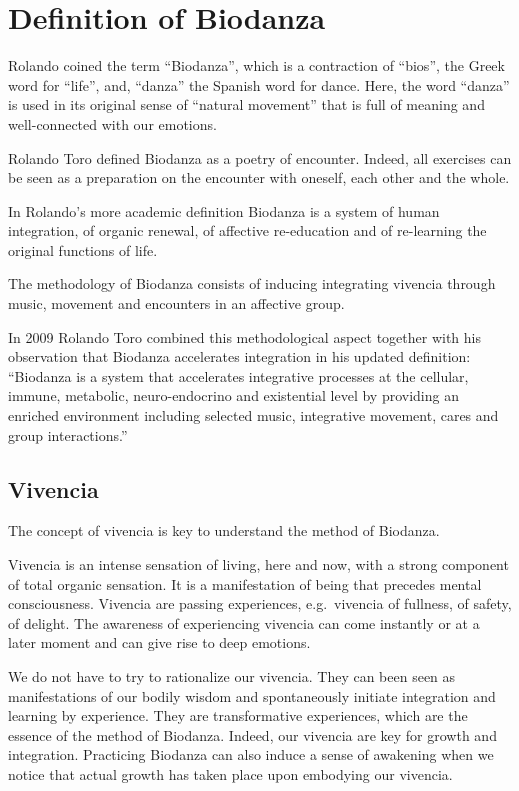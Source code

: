 \documentclass[
  11pt,
]{book}
\begin{document}
\hypertarget{definition-of-biodanza}{%
\section{Definition of Biodanza}\label{definition-of-biodanza}}

Rolando coined the term ``Biodanza'', which is a contraction of ``bios'', the Greek word for ``life'', and, ``danza'' the Spanish word for dance. Here, the word ``danza'' is used in its original sense of ``natural movement'' that is full of meaning and well-connected with our emotions.

Rolando Toro defined Biodanza as a poetry of encounter. Indeed, all exercises can be seen as a preparation on the encounter with oneself, each other and the whole.

In Rolando's more academic definition Biodanza is a system of human integration, of organic renewal, of affective re-education and of re-learning the original functions of life.

The methodology of Biodanza consists of inducing integrating vivencia through music, movement and encounters in an affective group.

In 2009 Rolando Toro combined this methodological aspect together with his observation that Biodanza accelerates integration in his updated definition: ``Biodanza is a system that accelerates integrative processes at the cellular, immune, metabolic, neuro-endocrino and existential level by providing an enriched environment including selected music, integrative movement, cares and group interactions.''

\hypertarget{vivencia}{%
\subsection{Vivencia}\label{vivencia}}

The concept of vivencia is key to understand the method of Biodanza.

Vivencia is an intense sensation of living, here and now, with a strong component of total organic sensation. It is a manifestation of being that precedes mental consciousness. Vivencia are passing experiences, e.g.~vivencia of fullness, of safety, of delight. The awareness of experiencing vivencia can come instantly or at a later moment and can give rise to deep emotions.

We do not have to try to rationalize our vivencia. They can been seen as manifestations of our bodily wisdom and spontaneously initiate integration and learning by experience. They are transformative experiences, which are the essence of the method of Biodanza. Indeed, our vivencia are key for growth and integration. Practicing Biodanza can also induce a sense of awakening when we notice that actual growth has taken place upon embodying our vivencia.
\end{document}
